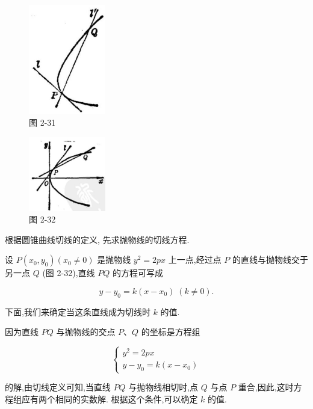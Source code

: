 \documentclass[lang=cn,newtx,10pt,scheme=chinese]{elegantbook}
\begin{document}
\begin{figure}[h]
  \centering
  \includegraphics[max width=0.3\textwidth]{images/01912cc2-ffb6-728e-9ae7-b113ff05c64b_117_209153.jpg}
  \caption{图 2-31}
\end{figure}



\begin{figure}[h]
  \centering
  \includegraphics[max width=0.3\textwidth]{images/01912cc2-ffb6-728e-9ae7-b113ff05c64b_117_627681.jpg}
  \caption{图 2-32}
\end{figure}



根据圆锥曲线切线的定义, 先求抛物线的切线方程.

设 \(P\left( {{x}_{0},{y}_{0}}\right) \left( {{x}_{0} \neq 0}\right)\) 是抛物线 \({y}^{2} = {2px}\) 上一点,经过点 \(P\) 的直线与抛物线交于另一点 \(Q\) (图 2-32),直线 \({PQ}\) 的方程可写成

\[
  y - {y}_{0} = k\left( {x - {x}_{0}}\right) \;\left( {k \neq 0}\right) .
\]

下面,我们来确定当这条直线成为切线时 \(k\) 的值.

因为直线 \({PQ}\) 与抛物线的交点 \(P\text{、}Q\) 的坐标是方程组

\[
  \left\{ \begin{array}{l} {y}^{2} = {2px} \\ y - {y}_{0} = k\left( {x - {x}_{0}}\right) \end{array}\right. \tag{1 2}
\]

的解,由切线定义可知,当直线 \({PQ}\) 与抛物线相切时,点 \(Q\) 与点 \(P\) 重合,因此,这时方程组应有两个相同的实数解. 根据这个条件,可以确定 \(k\) 的值.
\end{document}
